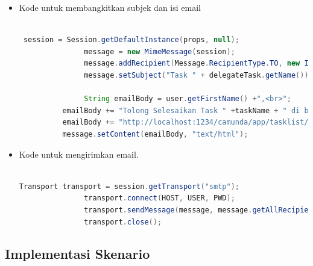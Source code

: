 \begin{itemize}
\begin{lstlisting}[language=Java,basicstyle=\tiny,caption =TaskAssignmentListener.java]
    	for(IdentityLinkEntity link : identityLinks) {
    		if(link.getType().equals(IdentityLinkType.CANDIDATE)) {
    		    if(link.isUser()) {
	    		     User user = Context.getProcessEngineConfiguration().getIdentityService().createUserQuery().userId(link.getUserId()).singleResult();
	    		     sendEmail(user);
    		    }
    		    if(link.isGroup()) {
    		        List<User> users = Context.getProcessEngineConfiguration().getIdentityService().createUserQuery().memberOfGroup(link.getGroupId()).list();
    		        for(User user : users) {
    		        	sendEmail(user);
    		        }
    		    }
    		}
    	}
	\end{lstlisting}
	
	

	\item Kode untuk membangkitkan subjek dan isi email
	\begin{lstlisting}[language=Java,basicstyle=\tiny,caption=TaskAssignmentListener.java]

 session = Session.getDefaultInstance(props, null);
               message = new MimeMessage(session);
               message.addRecipient(Message.RecipientType.TO, new InternetAddress(recipient));
               message.setSubject("Task " + delegateTask.getName());
               
               String emailBody = user.getFirstName() +",<br>";
          emailBody += "Tolong Selesaikan Task " +taskName + " di bawah ini.<br>";
          emailBody += "http://localhost:1234/camunda/app/tasklist/default/#/?task="+taskId;
          message.setContent(emailBody, "text/html");
\end{lstlisting}

	\item Kode untuk mengirimkan email.
	\begin{lstlisting}[language=Java,basicstyle=\tiny,caption=TaskAssignmentListener.java]

Transport transport = session.getTransport("smtp");            
               transport.connect(HOST, USER, PWD);
               transport.sendMessage(message, message.getAllRecipients());
               transport.close();
\end{lstlisting}
	
\end{itemize}

\subsection{Implementasi Skenario}
\label{implementasiskenario}

